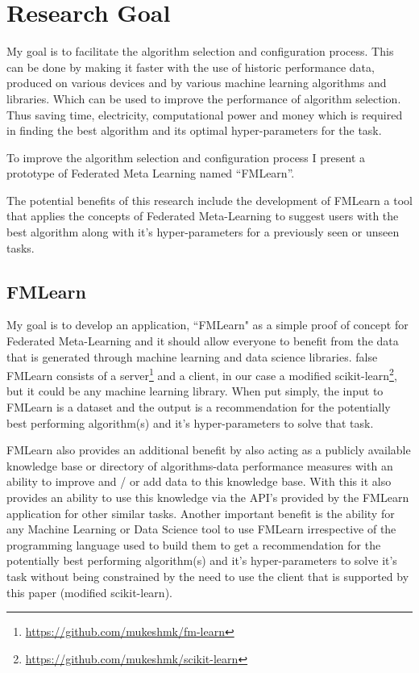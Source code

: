 \section{Research Goal}
My goal is to facilitate the algorithm selection and configuration process. This can be done by making it faster with the use of historic performance data, produced on various devices and by various machine learning algorithms and libraries. Which can be used to improve the performance of algorithm selection. Thus saving time, electricity, computational power and money which is required in finding the best algorithm and its optimal hyper-parameters for the task.

To improve the algorithm selection and configuration process I present a prototype of Federated Meta Learning named “FMLearn”.

The potential benefits of this research include the development of FMLearn a tool that applies the concepts of Federated Meta-Learning to suggest users with the best algorithm along with it's hyper-parameters for a previously seen or unseen tasks.

\subsection{FMLearn}
My goal is to develop an application, “FMLearn" as a simple proof of concept for Federated Meta-Learning and it should allow everyone to benefit from the data that is generated through machine learning and data science libraries. 
\if false
FMLearn consists of a server\footnote{\url{https://github.com/mukeshmk/fm-learn}} and a client, in our case a modified scikit-learn\footnote{\url{https://github.com/mukeshmk/scikit-learn}}, but it could be any machine learning library.
\fi
When put simply, the input to FMLearn is a dataset and the output is a recommendation for the potentially best performing algorithm(s) and it's hyper-parameters to solve that task.

FMLearn also provides an additional benefit by also acting as a publicly available knowledge base or directory of algorithms-data performance measures with an ability to improve and / or add data to this knowledge base. With this it also provides an ability to use this knowledge via the API's provided by the FMLearn application for other similar tasks. Another important benefit is the ability for any Machine Learning or Data Science tool to use FMLearn irrespective of the programming language used to build them to get a recommendation for the potentially best performing algorithm(s) and it's hyper-parameters to solve it's task without being constrained by the need to use the client that is supported by this paper (modified scikit-learn).

